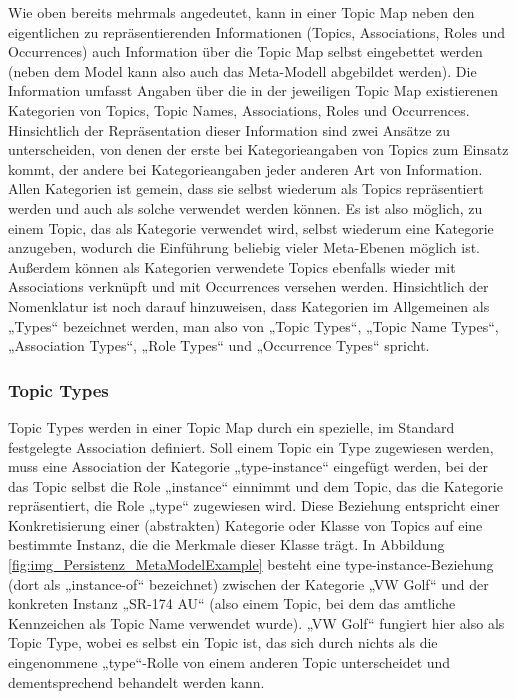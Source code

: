 Wie oben bereits mehrmals angedeutet, kann in einer Topic Map neben den eigentlichen zu repräsentierenden Informationen (Topics, Associations, Roles und Occurrences) auch Information über die Topic Map selbst eingebettet werden (neben dem Model kann also auch das Meta-Modell abgebildet werden). Die Information umfasst Angaben über die in der jeweiligen Topic Map existierenen Kategorien von Topics, Topic Names, Associations, Roles und Occurrences. Hinsichtlich der Repräsentation dieser Information sind zwei Ansätze zu unterscheiden, von denen der erste bei Kategorieangaben von Topics zum Einsatz kommt, der andere bei Kategorieangaben jeder anderen Art von Information. Allen Kategorien ist gemein, dass sie selbst wiederum als Topics repräsentiert werden und auch als solche verwendet werden können. Es ist also möglich, zu einem Topic, das als Kategorie verwendet wird, selbst wiederum eine Kategorie anzugeben, wodurch die Einführung beliebig vieler Meta-Ebenen möglich ist. Außerdem können als Kategorien verwendete Topics ebenfalls wieder mit Associations verknüpft und mit Occurrences versehen werden. Hinsichtlich der Nomenklatur ist noch darauf hinzuweisen, dass Kategorien im Allgemeinen als „Types“ bezeichnet werden, man also von „Topic Types“, „Topic Name Types“, „Association Types“, „Role Types“ und „Occurrence Types“ spricht.

\subsubsection{Topic Types}

Topic Types werden in einer Topic Map durch ein spezielle, im Standard festgelegte Association definiert. Soll einem Topic ein Type zugewiesen werden, muss eine Association der Kategorie „type-instance“ eingefügt werden, bei der das Topic selbst die Role „instance“ einnimmt und dem Topic, das die Kategorie repräsentiert, die Role „type“ zugewiesen wird. Diese Beziehung entspricht einer Konkretisierung einer (abstrakten) Kategorie oder Klasse von Topics auf eine bestimmte Instanz, die die Merkmale dieser Klasse trägt. In Abbildung \ref{fig:img_Persistenz_MetaModelExample} besteht eine type-instance-Beziehung (dort als „instance-of“ bezeichnet) zwischen der Kategorie „VW Golf“ und der konkreten Instanz „SR-174 AU“ (also einem Topic, bei dem das amtliche Kennzeichen als Topic Name verwendet wurde). „VW Golf“ fungiert hier also als Topic Type, wobei es selbst ein Topic ist, das sich durch nichts als die eingenommene „type“-Rolle von einem anderen Topic unterscheidet und dementsprechend behandelt werden kann.

